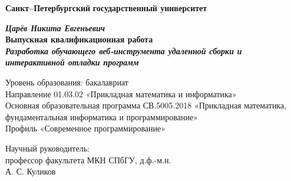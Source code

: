 
\begin{titlepage}
\begin{center}

\textbf{Санкт--Петербургский}
\textbf{государственный университет}

\vspace{35mm}

\textbf{\textit{\large Царёв Никита Евгеньевич}} \\[8mm]
\textbf{\large Выпускная квалификационная работа}\\[3mm]
\textbf{\textit{\large Разработка обучающего веб-инструмента удаленной сборки и интерактивной отладки программ}}

\vspace{20mm}
Уровень образования: бакалавриат\\
Направление 01.03.02 «Прикладная математика и информатика»\\
Основная образовательная программа СВ.5005.2018
«Прикладная математика, фундаментальная информатика и программирование»\\
Профиль «Современное программирование»

\vspace{7mm}

\begin{flushright}
\begin{minipage}[t]{0.65\textwidth}
{Научный руководитель:} \\
профессор факультета МКН СПбГУ, д.ф.-м.н. \\ А. С. Куликов


\end{minipage}
\end{flushright}
\end{center}
\end{titlepage}
